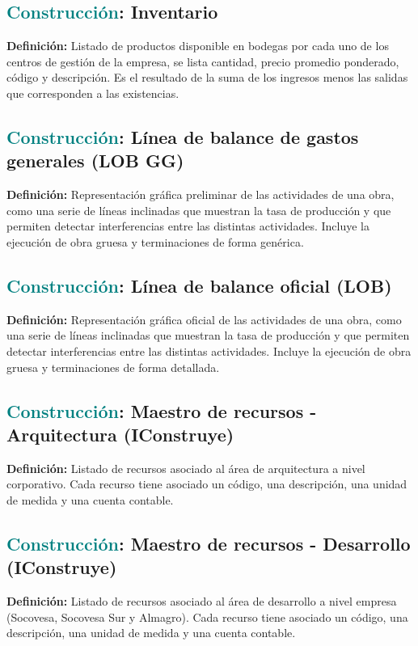\documentclass[12pt]{article}
\begin{document}
\subsection{\textcolor{teal}{Construcción}: Inventario}
\textbf{Definición:} Listado de productos disponible en bodegas por cada uno de los centros de gestión de la empresa, se lista cantidad, precio promedio ponderado, código y descripción. Es el resultado de la suma de los ingresos menos las salidas que corresponden a las existencias.
\subsection{\textcolor{teal}{Construcción}: Línea de balance de gastos generales (LOB GG)}
\textbf{Definición:} Representación gráfica preliminar de las actividades de una obra, como una serie de líneas inclinadas que muestran la tasa de producción y que permiten detectar interferencias entre las distintas actividades. Incluye la ejecución de obra gruesa y terminaciones de forma genérica.
\subsection{\textcolor{teal}{Construcción}: Línea de balance oficial (LOB)}
\textbf{Definición:} Representación gráfica oficial de las actividades de una obra, como una serie de líneas inclinadas que muestran la tasa de producción y que permiten detectar interferencias entre las distintas actividades. Incluye la ejecución de obra gruesa y terminaciones de forma detallada.
\subsection{\textcolor{teal}{Construcción}: Maestro de recursos - Arquitectura (IConstruye)}
\textbf{Definición:} Listado de recursos asociado al área de arquitectura a nivel corporativo. Cada recurso tiene asociado un código, una descripción, una unidad de medida y una cuenta contable.
\subsection{\textcolor{teal}{Construcción}: Maestro de recursos - Desarrollo (IConstruye)}
\textbf{Definición:} Listado de recursos asociado al área de desarrollo a nivel empresa (Socovesa, Socovesa Sur y Almagro). Cada recurso tiene asociado un código, una descripción, una unidad de medida y una cuenta contable.
\end{document}

